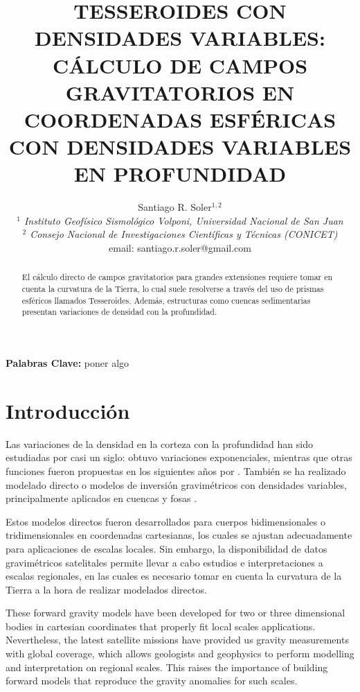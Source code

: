 \documentclass[a4paper,10pt]{article}
\title{
    \textbf{
    TESSEROIDES CON DENSIDADES VARIABLES:
    CÁLCULO DE CAMPOS GRAVITATORIOS EN COORDENADAS ESFÉRICAS CON
    DENSIDADES VARIABLES EN PROFUNDIDAD
    }
}
\author{
    Santiago R. Soler$^{1,2}$ \vspace{0.5em} \\ 
    \textit{$^1$ Instituto Geofísico Sismológico Volponi, Universidad Nacional de San Juan} \\
    \textit{$^2$ Consejo Nacional de Investigaciones Científicas y Técnicas (CONICET)} \vspace{0.4em} \\
    email: santiago.r.soler@gmail.com
}
\date{}
\begin{document}
\maketitle

\vspace{-2.5em}
\begin{center}
\textbf{Palabras Clave:} poner algo
\end{center}
\vspace{0.5em}

\begin{abstract}
El cálculo directo de campos gravitatorios para grandes extensiones requiere tomar en cuenta la curvatura de la Tierra, lo cual suele resolverse a través del uso de prismas esféricos llamados Tesseroides. Además, estructuras como cuencas sedimentarias presentan variaciones de densidad con la profundidad.

\end{abstract}


\section{Introducción}

Las variaciones de la densidad en la corteza con la profundidad han sido estudiadas por casi un siglo: \citet{Athy1930} obtuvo variaciones exponenciales, mientras que otras funciones fueron propuestas en los siguientes años por \citet{Maxant1980, Rao1986, Rao1993, Rao1994}.
También se ha realizado modelado directo o modelos de inversión gravimétricos con densidades variables, principalmente aplicados en cuencas y fosas \citep{Cordell1973, Rao1986, Cowie1990, Rao1993, Rao1994, Zhang2001, Welford2010}.

Estos modelos directos fueron desarrollados para cuerpos bidimensionales o tridimensionales en coordenadas cartesianas, los cuales se ajustan adecuadamente para aplicaciones de escalas locales.
Sin embargo, la disponibilidad de datos gravimétricos satelitales permite llevar a cabo estudios e interpretaciones a escalas regionales, en las cuales es necesario tomar en cuenta la curvatura de la Tierra a la hora de realizar modelados directos. 

These forward gravity models have been developed for two or three dimensional bodies in cartesian coordinates that properly fit local scales applications.
Nevertheless, the latest satellite missions have provided us gravity measurements with global coverage, which allows geologists and geophysics to perform modelling and interpretation on regional scales.
This raises the importance of building forward models that reproduce the gravity anomalies for such scales.
\end{document}
